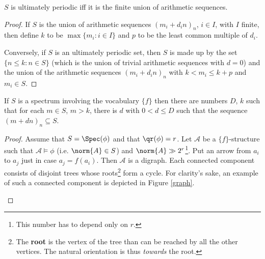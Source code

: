 \begin{lem} 
\label{lemmaf1} 
$S$ is ultimately periodic iff it is the finite union of arithmetic sequences.
\begin{proof} 
If $S$ is the union of arithmetic sequences $(m_i +d_i n)_n$, $i \in I$, with $I$ finite, then define $k$ to be $\max\{m_i : i \in I\}$ and $p$ to be the least common multiple of $d_i$. 

Conversely, if $S$ is an ultimately periodic set, then $S$ is made up by the set $\{n \le k : n \in S\}$ (which is the union of trivial arithmetic sequences with $d=0$) and the union of the arithmetic sequences $(m_i + d_i n)_n$ with $k < m_i \le k+p$ and $m_i \in S$. 
\end{proof}
\end{lem}

\begin{lem} \label{lemmaf2} 
If $S$ is a spectrum involving the vocabulary $\{f\}$ then there are numbers $D$, $k$ such that for each $m \in S$, $m>k$, there is $d$ with $0<d\le D$ such that the sequence $(m+dn)_n \subseteq S$. 

\begin{proof}
Assume that $S=\Spec(\phi)$ and that $\qr(\phi)=r$. 
Let $\mathcal{A}$ be a $\{f\}$-structure such that $\mathcal{A} \models \phi$ (i.e. $\norm{A} \in S$) and $\norm{A} \gg 2^{r}$\footnote{This number has to depend only on $r$.}. 
Put an arrow from $a_i$ to $a_j$ just in case $a_j=f(a_i)$. Then $\mathcal{A}$ is a digraph. 
Each connected component consists of disjoint trees whose roots\footnote{The \textbf{root} is the vertex of the tree than can be reached by all the other vertices. The natural orientation is thus \emph{towards} the root.}
form a cycle. 
For clarity's sake, an example of such a connected component is depicted in Figure \ref{graph}.

\begin{figure}
\centering
\usetikzlibrary{arrows.meta}


\end{figure}
\end{proof}
\end{lem}

